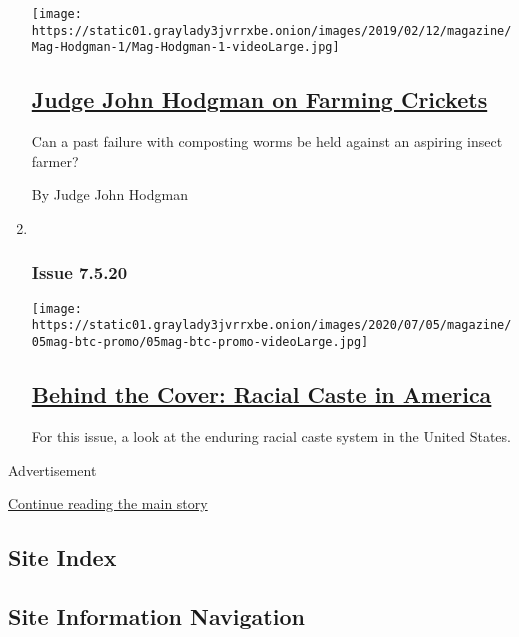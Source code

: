 \begin{enumerate}
  \texttt{[image: https://static01.graylady3jvrrxbe.onion/images/2019/02/12/magazine/Mag-Hodgman-1/Mag-Hodgman-1-videoLarge.jpg]}

  \hypertarget{judge-john-hodgman-on-farming-crickets}{%
  \subsection{\texorpdfstring{\href{/2020/07/02/magazine/judge-john-hodgman-on-farming-crickets.html}{Judge
  John Hodgman on Farming
  Crickets}}{Judge John Hodgman on Farming Crickets}}\label{judge-john-hodgman-on-farming-crickets}}

  Can a past failure with composting worms be held against an aspiring
  insect farmer?

  By Judge John Hodgman
\item ~
  \hypertarget{issue-7520}{%
  \subsubsection{Issue 7.5.20}\label{issue-7520}}

  \texttt{[image: https://static01.graylady3jvrrxbe.onion/images/2020/07/05/magazine/05mag-btc-promo/05mag-btc-promo-videoLarge.jpg]}

  \hypertarget{behind-the-cover-racial-caste-in-america}{%
  \subsection{\texorpdfstring{\href{/2020/07/02/magazine/behind-the-cover-racial-caste-in-america.html}{Behind
  the Cover: Racial Caste in
  America}}{Behind the Cover: Racial Caste in America}}\label{behind-the-cover-racial-caste-in-america}}

  For this issue, a look at the enduring racial caste system in the
  United States.
\end{enumerate}

Advertisement

\protect\hyperlink{after-mid1}{Continue reading the main story}

\hypertarget{site-index}{%
\subsection{Site Index}\label{site-index}}

\hypertarget{site-information-navigation}{%
\subsection{Site Information
Navigation}\label{site-information-navigation}}

